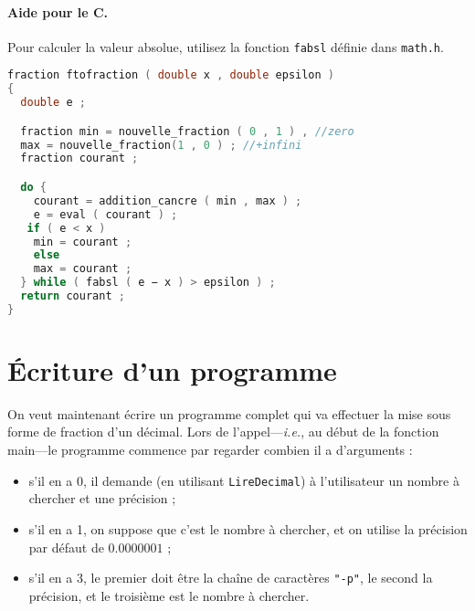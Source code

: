 \paragraph{Aide pour le C.} Pour
calculer la valeur absolue, utilisez la fonction \texttt{fabsl} définie dans
\texttt{math.h}.  

\begin{solutioncachee}
  \begin{lstlisting}[language=C]
fraction ftofraction ( double x , double epsilon ) 
{ 
  double e ;

  fraction min = nouvelle_fraction ( 0 , 1 ) , //zero
  max = nouvelle_fraction(1 , 0 ) ; //+infini
  fraction courant ;

  do {
    courant = addition_cancre ( min , max ) ;
    e = eval ( courant ) ; 
   if ( e < x )
    min = courant ;
    else
    max = courant ;
  } while ( fabsl ( e − x ) > epsilon ) ;
  return courant ;
}
\end{lstlisting}
\end{solutioncachee}



\section{Écriture d’un programme}

On veut maintenant écrire un programme complet qui va effectuer la
mise sous forme de fraction d’un décimal. Lors de
l’appel---\textit{i.e.}, au début de la fonction main---le programme
commence par regarder combien il a d’arguments :
\begin{itemize}
\item s’il en a 0, il demande (en utilisant \texttt{LireDecimal}) à
  l’utilisateur un nombre à chercher et une précision ;
\item s’il en a 1, on suppose que c’est le nombre à chercher, et on
  utilise la précision par défaut de \(0.0000001\) ;
\item s’il en a 3, le premier doit être la chaîne de caractères
  \texttt{"-p"}, le second la précision, et le troisième est le nombre
  à chercher.
\end{itemize}


